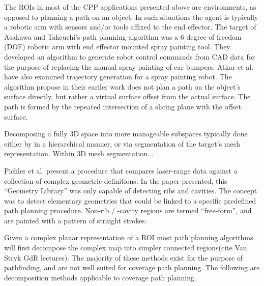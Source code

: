 The ROIs in most of the CPP applications presented above are environments, as opposed to planning a path on an object.
In such situations the agent is typically a robotic arm with sensors and/or tools affixed to the end effector\cite{Metal_polishing_robot_sys, Automatic_spray_painting_unknown_parts}.
The target of Asakawa and Takeuchi's path planning algorithm was a 6 degree of freedom (DOF) robotic arm with end effector mounted spray painting tool\cite{Automatic_spray_painting_path}.
They developed an algorithm to generate robot control commands from CAD data for the purpose of replacing the manual spray painting of car bumpers.
Atkar et al. have also examined trajectory generation for a spray painting robot.
The algorithm propose in their eariler work does not plan a path on the object's surface directly, but rather a virtual surface offset from the actual surface.
The path is formed by the repeated intersection of a slicing plane with the offset surface.

Decomposing a fully 3D space into more manageable subspaces typically done either by in a hierarchical manner\cite{HiCPP_cplx_3D_env}, or via segmentation of the target's mesh representation\cite{Mesh_segm_technik_survey}.
Within 3D mesh segmentation...

Pichler et al. present a procedure that compares laser-range data against a collection of complex geometric definitions\cite{Automatic_spray_painting_unknown_parts}.
In the paper presented, this ``Geometry Library'' was only capable of detecting ribs and cavities.
The concept was to detect elementary geometries that could be linked to a specific predefined path planning procedure.
Non-rib / -cavity regions are termed ``free-form'', and are painted with a pattern of straight strokes.

Given a complex planar representation of a ROI most path planning algorithms will first decompose the complex map into simpler connected regions\cite{Cell_decomposition_survey}(cite Van Stryk GdR lectures).
The majority of these methods exist for the purpose of pathfinding, and are not well suited for coverage path planning.
The following are decomposition methods applicable to coverage path planning.

